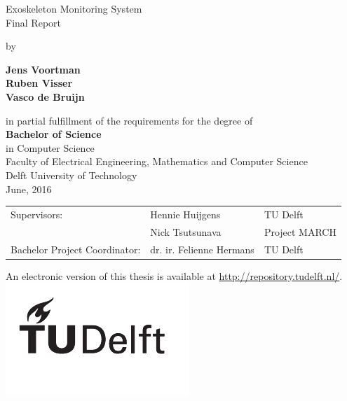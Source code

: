 \begin{titlepage}
\begin{center}

{\makeatletter
\Huge Exoskeleton Monitoring System
\makeatother}\\[0.2cm]

{\makeatletter
\LARGE Final Report
\makeatother}

\bigskip
\bigskip

by

\bigskip
\bigskip

{\makeatletter \bfseries
Jens Voortman\\
Ruben Visser\\
Vasco de Bruijn
\makeatother}

\vfill
in partial fulfillment of the requirements for the degree of\\
\bigskip
{\bfseries \large Bachelor of Science}\\
{\large in Computer Science}\\
\bigskip
Faculty of Electrical Engineering, Mathematics and Computer Science\\
Delft University of Technology\\
{\large June, 2016}\\



\vfill

\begin{tabular}{l l l}
    Supervisors: & Hennie Huijgens & TU Delft \\
    & Nick Tsutsunava & Project MARCH \\
    Bachelor Project Coordinator: & dr. ir. Felienne Hermans & TU Delft\\
 \end{tabular}

\bigskip
\bigskip

\bigskip
\bigskip

An electronic version of this thesis is available at \url{http://repository.tudelft.nl/}.\\[0.5cm]
\includegraphics{logo/logo_black}
\end{center}
\end{titlepage}